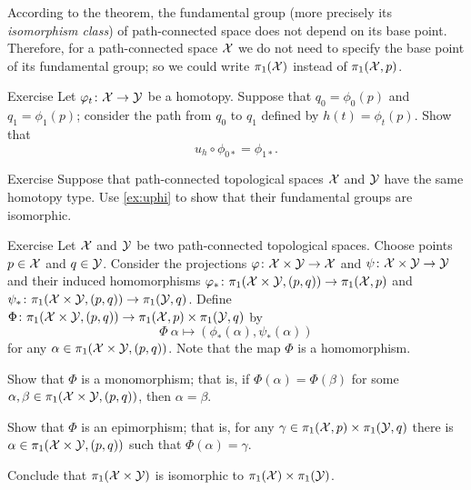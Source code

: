 According to the theorem, the fundamental group (more precisely its \textit{isomorphism class}) of path-connected space does not depend on its base point.
Therefore, for a path-connected space $\mathcal{X}$ we do not need to specify the base point of its fundamental group; so we could write $\pi_1(\mathcal{X})$ instead of $\pi_1(\mathcal{X},p)$.

\begin{thm}{Exercise}\label{ex:uphi}
Let $\varphi_t\colon\mathcal{X}\to\mathcal{Y}$ be a homotopy.
Suppose that $q_0=\phi_0(p)$ and $q_1=\phi_1(p)$; 
consider the path from $q_0$ to $q_1$ defined by $h(t)=\phi_t(p)$.
Show that 
\[u_h\circ \phi_{0*}=\phi_{1*}.\]
\end{thm}

\begin{thm}{Exercise}
Suppose that path-connected topological spaces $\mathcal{X}$ and $\mathcal{Y}$ have the same homotopy type.
Use \ref{ex:uphi} to show that their fundamental groups are isomorphic.
\end{thm}



\begin{thm}{Exercise}
Let $\mathcal{X}$ and $\mathcal{Y}$ be two path-connected topological spaces.
Choose points $p\in \mathcal{X}$ and $q\in \mathcal{Y}$.
Consider the projections $\varphi\colon\mathcal{X}\times\mathcal{Y}\to \mathcal{X}$ and $\psi\colon\mathcal{X}\times\mathcal{Y}\to \mathcal{Y}$
and their induced homomorphisms
$\varphi_*\colon\pi_1(\mathcal{X}\times\mathcal{Y},(p,q))\to \pi_1(\mathcal{X},p)$
and $\psi_*\colon\pi_1(\mathcal{X}\times\mathcal{Y},(p,q))\to \pi_1(\mathcal{Y},q)$.
Define $\Phi\colon\pi_1(\mathcal{X}\times\mathcal{Y},(p,q))\to \pi_1(\mathcal{X},p)\times \pi_1(\mathcal{Y},q)$ by
\[\Phi\:\alpha\mapsto (\phi_*(\alpha),\psi_*(\alpha))\]
for any $\alpha\in \pi_1(\mathcal{X}\times\mathcal{Y},(p,q))$.
Note that the map $\Phi$ is a homomorphism.

\begin{subthm}{}
Show that $\Phi$ is a monomorphism;
that is, if $\Phi(\alpha)=\Phi(\beta)$ for some $\alpha,\beta\in \pi_1(\mathcal{X}\times\mathcal{Y},(p,q))$, then 
$\alpha=\beta$.
\end{subthm}

\begin{subthm}{}
Show that $\Phi$ is an epimorphism;
that is, for any $\gamma\in \pi_1(\c{X},p)\z\times\pi_1(\c{Y},q)$ there is $\alpha\in\pi_1(\mathcal{X}\times\mathcal{Y},(p,q))$ such that $\Phi(\alpha)=\gamma$.
\end{subthm}

Conclude that $\pi_1(\mathcal{X}\times\mathcal{Y})$ is isomorphic to $\pi_1(\mathcal{X})\times\pi_1(\mathcal{Y})$.
\end{thm}

